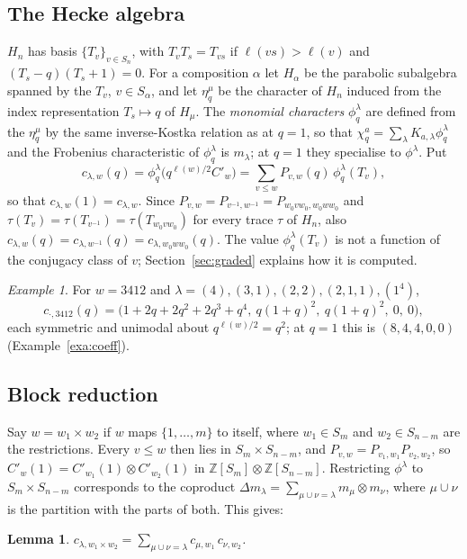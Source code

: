 \documentclass[11pt]{amsart}
\newtheorem{lemma}[theorem]{Lemma}
\theoremstyle{definition}
\theoremstyle{remark}
\newtheorem{exa}{Example}[section]
\newcommand{\Z}{\mathbb{Z}}
\newcommand{\Cp}[1]{C'_{#1}(1)}
\begin{document}
\subsection{The Hecke algebra}\label{sec:hecke}
$H_n$ has basis $\{T_v\}_{v\in S_n}$, with $T_vT_s=T_{vs}$ if $\ell(vs)>\ell(v)$ and $(T_s-q)(T_s+1)=0$. For a composition $\alpha$ let $H_\alpha$ be the parabolic subalgebra spanned by the $T_v$, $v\in S_\alpha$, and let $\eta^\mu_q$ be the character of $H_n$ induced from the index representation $T_s\mapsto q$ of $H_\mu$. The \emph{monomial characters} $\phi^\lambda_q$ are defined from the $\eta^\mu_q$ by the same inverse-Kostka relation as at $q=1$, so that $\chi^a_q=\sum_\lambda K_{a,\lambda}\phi^\lambda_q$ and the Frobenius characteristic of $\phi^\lambda_q$ is $m_\lambda$; at $q=1$ they specialise to $\phi^\lambda$. Put
\[
c_{\lambda,w}(q)=\phi^\lambda_q\bigl(q^{\ell(w)/2}C'_w\bigr)=\sum_{v\le w}P_{v,w}(q)\,\phi^\lambda_q(T_v),
\]
so that $c_{\lambda,w}(1)=c_{\lambda,w}$. Since $P_{v,w}=P_{v^{-1},w^{-1}}=P_{w_0vw_0,w_0ww_0}$ and $\tau(T_v)=\tau(T_{v^{-1}})=\tau(T_{w_0vw_0})$ for every trace $\tau$ of $H_n$, also $c_{\lambda,w}(q)=c_{\lambda,w^{-1}}(q)=c_{\lambda,w_0ww_0}(q)$. The value $\phi^\lambda_q(T_v)$ is not a function of the conjugacy class of $v$; Section~\ref{sec:graded} explains how it is computed.

\begin{exa}\label{exa:graded}
For $w=3412$ and $\lambda=(4),(3,1),(2,2),(2,1,1),(1^4)$,
\[
c_{\cdot,3412}(q)=\bigl(1+2q+2q^2+2q^3+q^4,\ q(1+q)^2,\ q(1+q)^2,\ 0,\ 0\bigr),
\]
each symmetric and unimodal about $q^{\ell(w)/2}=q^2$; at $q=1$ this is $(8,4,4,0,0)$ (Example~\ref{exa:coeff}).
\end{exa}

\subsection{Block reduction}
Say $w=w_1\times w_2$ if $w$ maps $\{1,\dots,m\}$ to itself, where $w_1\in S_m$ and $w_2\in S_{n-m}$ are the restrictions. Every $v\le w$ then lies in $S_m\times S_{n-m}$, and $P_{v,w}=P_{v_1,w_1}P_{v_2,w_2}$, so $\Cp{w}=\Cp{w_1}\otimes\Cp{w_2}$ in $\Z[S_m]\otimes\Z[S_{n-m}]$. Restricting $\phi^\lambda$ to $S_m\times S_{n-m}$ corresponds to the coproduct $\Delta m_\lambda=\sum_{\mu\cup\nu=\lambda}m_\mu\otimes m_\nu$, where $\mu\cup\nu$ is the partition with the parts of both. This gives:

\begin{lemma}\label{lem:coproduct}
$c_{\lambda,w_1\times w_2}=\sum_{\mu\cup\nu=\lambda}c_{\mu,w_1}\,c_{\nu,w_2}$.
\end{lemma}
\end{document}
